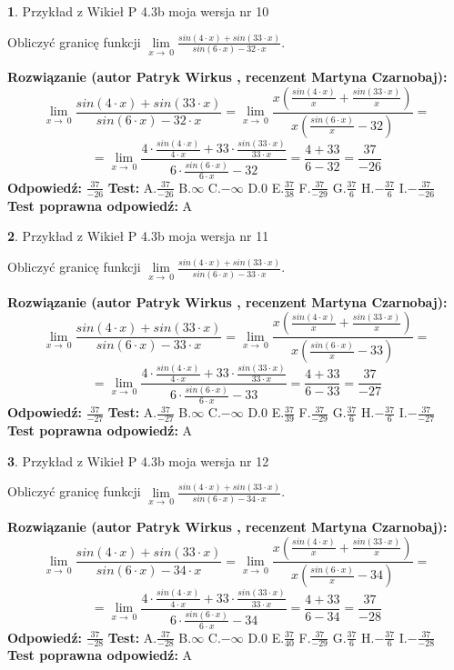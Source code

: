 \documentclass[12pt, a4paper]{article}
\theoremstyle{definition} %
\newtheorem{zad}{}
\newcommand{\zadStart}[1]{\begin{zad}#1\newline}
\newcommand{\zadStop}{\end{zad}}
\newcommand{\rozwStart}[2]{\noindent \textbf{Rozwiązanie (autor #1 , recenzent #2): }\newline}
\newcommand{\rozwStop}{\newline}
\newcommand{\odpStart}{\noindent \textbf{Odpowiedź:}\newline}
\newcommand{\odpStop}{\newline}
\newcommand{\testStart}{\noindent \textbf{Test:}\newline}
\newcommand{\testStop}{\newline}
\newcommand{\kluczStart}{\noindent \textbf{Test poprawna odpowiedź:}\newline}
\newcommand{\kluczStop}{\newline}
\begin{document}
\zadStart{Przykład z Wikieł P 4.3b moja wersja nr 10}


Obliczyć granicę funkcji $\lim\limits_{x\to\ 0}\frac{sin(4 \cdot x)+sin(33 \cdot x)}{sin(6 \cdot x)-32 \cdot x}$.
\zadStop
\rozwStart{Patryk Wirkus}{Martyna Czarnobaj}
$$\lim\limits_{x\to\ 0}\frac{sin(4 \cdot x)+sin(33 \cdot x)}{sin(6 \cdot x)-32 \cdot x}=\lim\limits_{x\to\ 0}\frac{x(\frac{sin(4 \cdot x)}{x}+\frac{sin(33 \cdot x)}{x})}{x(\frac{sin(6 \cdot x)}{x}-32)}=$$
$$=\lim\limits_{x\to\ 0}\frac{4 \cdot \frac{sin(4 \cdot x)}{4 \cdot x}+33 \cdot \frac{sin(33 \cdot x)}{33 \cdot x}}{6 \cdot \frac{sin(6 \cdot x)}{6 \cdot x}-32}=\frac{4+33}{6-32} = \frac{37}{-26}$$
\rozwStop
\odpStart
$\frac{37}{-26}$
\odpStop
\testStart
A.$\frac{37}{-26}$
B.$\infty$
C.$-\infty$
D.$0$
E.$\frac{37}{38}$
F.$\frac{37}{-29}$
G.$\frac{37}{6}$
H.$-\frac{37}{6}$
I.$-\frac{37}{-26}$
\testStop
\kluczStart
A
\kluczStop



\zadStart{Przykład z Wikieł P 4.3b moja wersja nr 11}


Obliczyć granicę funkcji $\lim\limits_{x\to\ 0}\frac{sin(4 \cdot x)+sin(33 \cdot x)}{sin(6 \cdot x)-33 \cdot x}$.
\zadStop
\rozwStart{Patryk Wirkus}{Martyna Czarnobaj}
$$\lim\limits_{x\to\ 0}\frac{sin(4 \cdot x)+sin(33 \cdot x)}{sin(6 \cdot x)-33 \cdot x}=\lim\limits_{x\to\ 0}\frac{x(\frac{sin(4 \cdot x)}{x}+\frac{sin(33 \cdot x)}{x})}{x(\frac{sin(6 \cdot x)}{x}-33)}=$$
$$=\lim\limits_{x\to\ 0}\frac{4 \cdot \frac{sin(4 \cdot x)}{4 \cdot x}+33 \cdot \frac{sin(33 \cdot x)}{33 \cdot x}}{6 \cdot \frac{sin(6 \cdot x)}{6 \cdot x}-33}=\frac{4+33}{6-33} = \frac{37}{-27}$$
\rozwStop
\odpStart
$\frac{37}{-27}$
\odpStop
\testStart
A.$\frac{37}{-27}$
B.$\infty$
C.$-\infty$
D.$0$
E.$\frac{37}{39}$
F.$\frac{37}{-29}$
G.$\frac{37}{6}$
H.$-\frac{37}{6}$
I.$-\frac{37}{-27}$
\testStop
\kluczStart
A
\kluczStop



\zadStart{Przykład z Wikieł P 4.3b moja wersja nr 12}


Obliczyć granicę funkcji $\lim\limits_{x\to\ 0}\frac{sin(4 \cdot x)+sin(33 \cdot x)}{sin(6 \cdot x)-34 \cdot x}$.
\zadStop
\rozwStart{Patryk Wirkus}{Martyna Czarnobaj}
$$\lim\limits_{x\to\ 0}\frac{sin(4 \cdot x)+sin(33 \cdot x)}{sin(6 \cdot x)-34 \cdot x}=\lim\limits_{x\to\ 0}\frac{x(\frac{sin(4 \cdot x)}{x}+\frac{sin(33 \cdot x)}{x})}{x(\frac{sin(6 \cdot x)}{x}-34)}=$$
$$=\lim\limits_{x\to\ 0}\frac{4 \cdot \frac{sin(4 \cdot x)}{4 \cdot x}+33 \cdot \frac{sin(33 \cdot x)}{33 \cdot x}}{6 \cdot \frac{sin(6 \cdot x)}{6 \cdot x}-34}=\frac{4+33}{6-34} = \frac{37}{-28}$$
\rozwStop
\odpStart
$\frac{37}{-28}$
\odpStop
\testStart
A.$\frac{37}{-28}$
B.$\infty$
C.$-\infty$
D.$0$
E.$\frac{37}{40}$
F.$\frac{37}{-29}$
G.$\frac{37}{6}$
H.$-\frac{37}{6}$
I.$-\frac{37}{-28}$
\testStop
\kluczStart
A
\kluczStop
\end{document}
